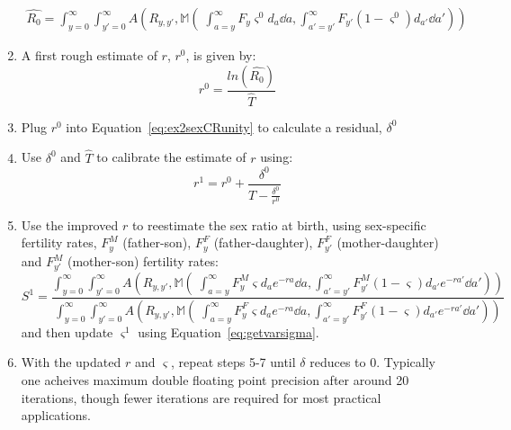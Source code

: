 \begin{enumerate}
 \begin{equation}
 \begin{split}
 \widehat{R_0} = \int_{y=0}^\infty \int_{y'=0}^\infty
A\left(R_{y,y'},\mathbb{M}\left(\;\int_{a=y}^\infty F_y \varsigma^0 d_a \dd a,
\int _{a'=y'}^\infty F_{y'} (1-\varsigma^0) d_{a'} \dd a'\right)\right)
 \end{split}
 \end{equation}
  \item A first rough estimate of $r$, $r^0$, is given by:
   \begin{equation}
   r^0 = \frac{ln(\widehat{R_0})}{\widehat{T}}
   \end{equation}
  \item Plug $r^0$ into Equation~\ref{eq:ex2sexCRunity} to calculate a
  residual, $\delta^0$
  \item Use $\delta^0$ and $\widehat{T}$ to calibrate the estimate of $r$
  using:
  \begin{equation}
  r^{1} = r^0 + \frac{\delta^0}{\widehat{T} - \frac{\delta^0}{r^0}}
  \end{equation}
  \item Use the improved $r$ to reestimate the sex ratio at birth, using
  sex-specific fertility rates, $F_y^M$ (father-son), $F_y^F$
  (father-daughter), $F_{y'}^F$ (mother-daughter) and $F_{y'}^M$ (mother-son)
  fertility rates:
  \begin{equation}
  S^1 = \frac{\int_{y=0}^\infty \int_{y'=0}^\infty
A\left(R_{y,y'},\mathbb{M}\left(\;\int_{a=y}^\infty F_y^M \varsigma d_ae^{-ra}
\dd a, \int _{a'=y'}^\infty F_{y'}^M (1-\varsigma) d_{a'}e^{-ra'} \dd
a'\right)\right)}{\int_{y=0}^\infty \int_{y'=0}^\infty A\left(R_{y,y'},
\mathbb{M}\left(\;\int_{a=y}^\infty F_y^F \varsigma d_a e^{-ra} \dd a, \int
_{a'=y'}^\infty F_{y'}^F (1-\varsigma) d_{a'}e^{-ra'} \dd a'\right)\right)}
  \end{equation}
  and then update $\varsigma^1$ using Equation~\eqref{eq:getvarsigma}.
  \item With the updated $r$ and $\varsigma$, repeat steps 5-7 until $\delta$
  reduces to 0. Typically one acheives maximum double floating point precision
  after around 20 iterations, though fewer iterations are required for
  most practical applications.
\end{enumerate}











